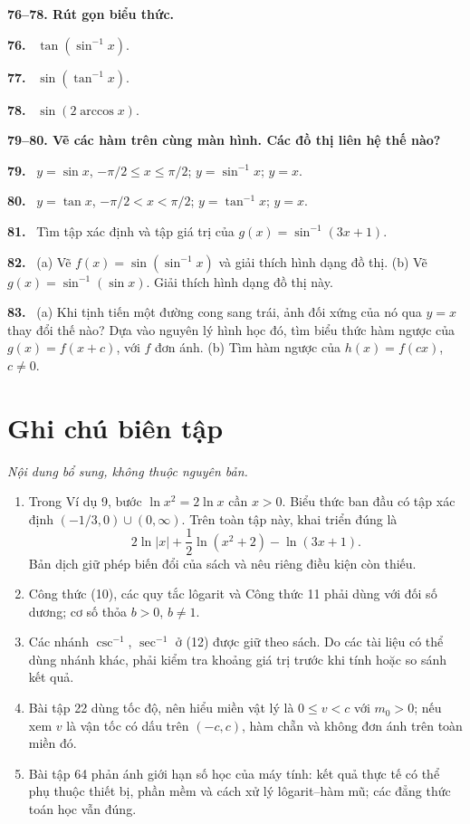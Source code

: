 \documentclass[12pt,a4paper]{article}
\newcommand{\bt}[1]{\par\smallskip\noindent\textbf{#1.}\ }
\newcommand{\group}[1]{\par\medskip\noindent\textbf{#1}\par}
\begin{document}
\group{76–78. Rút gọn biểu thức.}
\bt{76} $\tan(\sin^{-1}x)$.
\bt{77} $\sin(\tan^{-1}x)$.
\bt{78} $\sin(2\arccos x)$.
\group{79–80. Vẽ các hàm trên cùng màn hình. Các đồ thị liên hệ thế nào?}
\bt{79} $y=\sin x$, $-\pi/2\le x\le\pi/2$; $y=\sin^{-1}x$; $y=x$.
\bt{80} $y=\tan x$, $-\pi/2<x<\pi/2$; $y=\tan^{-1}x$; $y=x$.
\bt{81} Tìm tập xác định và tập giá trị của $g(x)=\sin^{-1}(3x+1)$.
\bt{82} (a) Vẽ $f(x)=\sin(\sin^{-1}x)$ và giải thích hình dạng đồ thị. (b) Vẽ $g(x)=\sin^{-1}(\sin x)$. Giải thích hình dạng đồ thị này.
\bt{83} (a) Khi tịnh tiến một đường cong sang trái, ảnh đối xứng của nó qua $y=x$ thay đổi thế nào? Dựa vào nguyên lý hình học đó, tìm biểu thức hàm ngược của $g(x)=f(x+c)$, với $f$ đơn ánh. (b) Tìm hàm ngược của $h(x)=f(cx)$, $c\ne0$.

\clearpage
\section*{Ghi chú biên tập}
\noindent\textit{Nội dung bổ sung, không thuộc nguyên bản.}
\begin{enumerate}[leftmargin=*,itemsep=5pt]
\item Trong Ví dụ 9, bước $\ln x^2=2\ln x$ cần $x>0$. Biểu thức ban đầu có tập xác định $(-1/3,0)\cup(0,\infty)$. Trên toàn tập này, khai triển đúng là
\[2\ln|x|+\frac12\ln(x^2+2)-\ln(3x+1).\]
Bản dịch giữ phép biến đổi của sách và nêu riêng điều kiện còn thiếu.
\item Công thức (10), các quy tắc lôgarit và Công thức 11 phải dùng với đối số dương; cơ số thỏa $b>0$, $b\ne1$.
\item Các nhánh $\csc^{-1}$, $\sec^{-1}$ ở (12) được giữ theo sách. Do các tài liệu có thể dùng nhánh khác, phải kiểm tra khoảng giá trị trước khi tính hoặc so sánh kết quả.
\item Bài tập 22 dùng tốc độ, nên hiểu miền vật lý là $0\le v<c$ với $m_0>0$; nếu xem $v$ là vận tốc có dấu trên $(-c,c)$, hàm chẵn và không đơn ánh trên toàn miền đó.
\item Bài tập 64 phản ánh giới hạn số học của máy tính: kết quả thực tế có thể phụ thuộc thiết bị, phần mềm và cách xử lý lôgarit–hàm mũ; các đẳng thức toán học vẫn đúng.
\end{enumerate}
\end{document}
